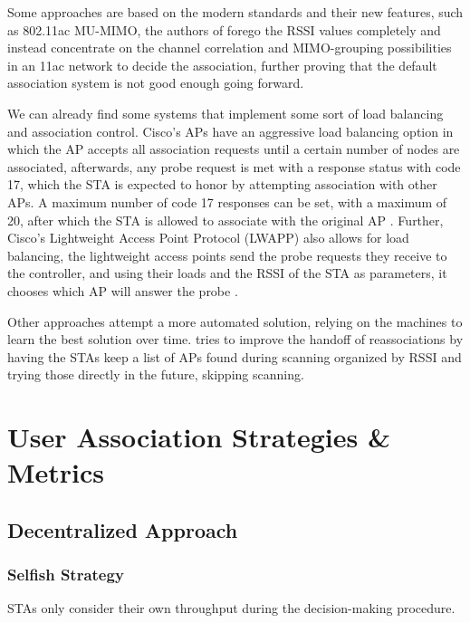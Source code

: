 \documentclass{ article}
\begin{document}
	Some approaches are based on the modern standards and their new features, such as 802.11ac MU-MIMO, the authors of \cite{mimo2017} forego the RSSI values completely and instead concentrate on the channel correlation and MIMO-grouping possibilities in an 11ac network to decide the association, further proving that the default association system is not good enough going forward.
	
We can already find some systems that implement some sort of load balancing and association control. Cisco's APs have an aggressive load balancing option in which the AP accepts all association requests until a certain number of nodes are associated, afterwards, any probe request is met with a response status with code 17, which the STA is expected to honor by attempting association with other APs. A maximum number of code 17 responses can be set, with a maximum of 20, after which the STA is allowed to associate with the original AP \cite{cisco2017}. Further, Cisco's Lightweight Access Point Protocol (LWAPP) also allows for load balancing, the lightweight access points send the probe requests they receive to the controller, and using their loads and the RSSI of the STA as parameters, it chooses which AP will answer the probe \cite{cisco2006}.

Other approaches attempt a more automated solution, relying on the machines to learn the best solution over time. \cite{shin2004} tries to improve the handoff of reassociations by having the STAs keep a list of APs found during scanning organized by RSSI and trying those directly in the future, skipping scanning.
	
	
	
	
\section{User Association Strategies \& Metrics}
\label{section:strategies}

	\subsection{Decentralized Approach}
	\label{section:decentralized}
	
		\subsubsection{Selfish Strategy}
		\label{section:selfish}
			STAs only consider their own throughput during the decision-making procedure.
			
\end{document}
